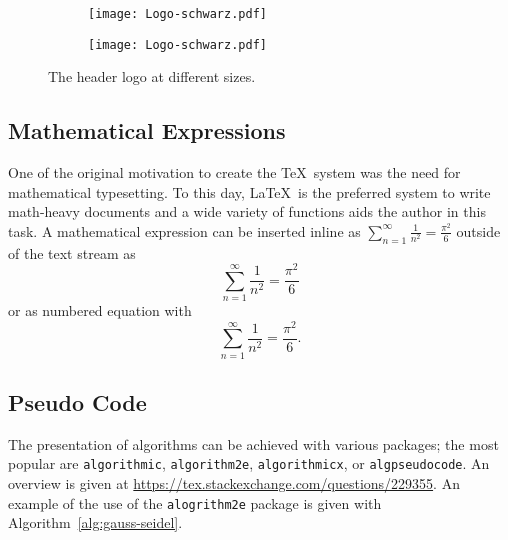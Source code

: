 \begin{figure}[h]
    \centering
    \begin{subfigure}[b]{0.45\columnwidth}
        \centering
        \texttt{[image: Logo-schwarz.pdf]}
        \label{fig:intro:full width}
    \end{subfigure}
    \begin{subfigure}[b]{0.45\columnwidth}
        \centering
        \texttt{[image: Logo-schwarz.pdf]}
        \label{fig:intro:half width}
    \end{subfigure}
    \caption[Optional caption for the figure list (often used to abbreviate long captions)]{The header logo at different sizes.} %
    \label{fig:intro} %
\end{figure}

\subsection{Mathematical Expressions}

One of the original motivation to create the \TeX\ system was the need for mathematical typesetting.
To this day, \LaTeX\ is the preferred system to write math-heavy documents and a wide variety of functions aids the author in this task.
A mathematical expression can be inserted inline as $\sum_{n=1}^{\infty} \frac{1}{n^2} = \frac{\pi^2}{6}$ outside of the text stream as \[ \sum_{n=1}^{\infty} \frac{1}{n^2} = \frac{\pi^2}{6} \] or as numbered equation with
\begin{equation}
    \sum_{n=1}^{\infty} \frac{1}{n^2} = \frac{\pi^2}{6}.
\end{equation}

\subsection{Pseudo Code}

The presentation of algorithms can be achieved with various packages; the most popular are \verb|algorithmic|, \verb|algorithm2e|, \verb|algorithmicx|, or \verb|algpseudocode|.
An overview is given at \url{https://tex.stackexchange.com/questions/229355}.
An example of the use of the \verb|alogrithm2e| package is given with Algorithm~\ref{alg:gauss-seidel}.

